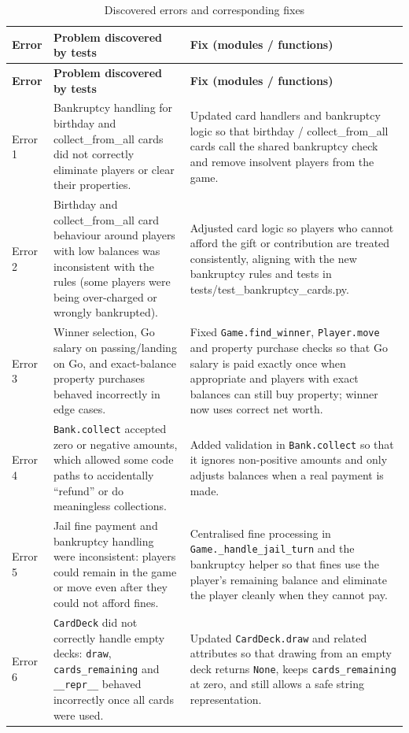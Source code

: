 \documentclass[11pt]{article}
\begin{document}
\begin{longtable}{>{\raggedright\arraybackslash}p{} >{\raggedright\arraybackslash}p{} >{\raggedright\arraybackslash}p{}}
\caption{Discovered errors and corresponding fixes}\label{tab:errors}\\\hline
\textbf{Error} & \textbf{Problem discovered by tests} & \textbf{Fix (modules / functions)} \\ \hline
\endfirsthead
\hline
\textbf{Error} & \textbf{Problem discovered by tests} & \textbf{Fix (modules / functions)} \\ \hline
\endhead
Error 1 & Bankruptcy handling for birthday and collect\_from\_all cards did not correctly eliminate players or clear their properties. & Updated card handlers and bankruptcy logic so that birthday / collect\_from\_all cards call the shared bankruptcy check and remove insolvent players from the game. \\ \hline
Error 2 & Birthday and collect\_from\_all card behaviour around players with low balances was inconsistent with the rules (some players were being over-charged or wrongly bankrupted). & Adjusted card logic so players who cannot afford the gift or contribution are treated consistently, aligning with the new bankruptcy rules and tests in tests/test\_bankruptcy\_cards.py. \\ \hline
Error 3 & Winner selection, Go salary on passing/landing on Go, and exact-balance property purchases behaved incorrectly in edge cases. & Fixed \texttt{Game.find\_winner}, \texttt{Player.move} and property purchase checks so that Go salary is paid exactly once when appropriate and players with exact balances can still buy property; winner now uses correct net worth. \\ \hline
Error 4 & \texttt{Bank.collect} accepted zero or negative amounts, which allowed some code paths to accidentally ``refund'' or do meaningless collections. & Added validation in \texttt{Bank.collect} so that it ignores non-positive amounts and only adjusts balances when a real payment is made. \\ \hline
Error 5 & Jail fine payment and bankruptcy handling were inconsistent: players could remain in the game or move even after they could not afford fines. & Centralised fine processing in \texttt{Game.\_handle\_jail\_turn} and the bankruptcy helper so that fines use the player's remaining balance and eliminate the player cleanly when they cannot pay. \\ \hline
Error 6 & \texttt{CardDeck} did not correctly handle empty decks: \texttt{draw}, \texttt{cards\_remaining} and \texttt{\_\_repr\_\_} behaved incorrectly once all cards were used. & Updated \texttt{CardDeck.draw} and related attributes so that drawing from an empty deck returns \texttt{None}, keeps \texttt{cards\_remaining} at zero, and still allows a safe string representation. \\ \hline

\end{longtable}
\end{document}
